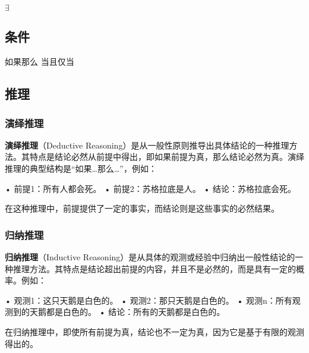 $\exists$

\subsection{条件}
如果那么 当且仅当
\subsection{推理}

\subsubsection{演绎推理}
\textbf{演绎推理}（Deductive Reasoning）是从一般性原则推导出具体结论的一种推理方法。其特点是结论必然从前提中得出，即如果前提为真，那么结论必然为真。演绎推理的典型结构是“如果…那么…”，例如：

	•	前提1：所有人都会死。
	•	前提2：苏格拉底是人。
	•	结论：苏格拉底会死。

在这种推理中，前提提供了一定的事实，而结论则是这些事实的必然结果。
\subsubsection{归纳推理}

\textbf{归纳推理}（Inductive Reasoning）是从具体的观测或经验中归纳出一般性结论的一种推理方法。其特点是结论超出前提的内容，并且不是必然的，而是具有一定的概率。例如：

	•	观测1：这只天鹅是白色的。
	•	观测2：那只天鹅是白色的。
	•	观测n：所有观测到的天鹅都是白色的。
	•	结论：所有的天鹅都是白色的。

在归纳推理中，即使所有前提为真，结论也不一定为真，因为它是基于有限的观测得出的。